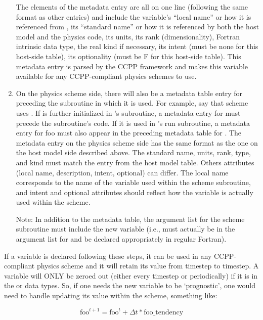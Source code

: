 \begin{enumerate}
The elements of the metadata entry are all on one line (following the same format as other entries) and include the variable's ``local name'' or how it is referenced from , its ``standard name'' or how it is referenced by both the host model and the physics code, its units, its rank (dimensionality), Fortran intrinsic data type, the real kind if necessary, its intent (must be none for this host-side table), its optionality (must be F for this host-side table). This metadata entry is parsed by the CCPP framework and makes this variable available for any CCPP-compliant physics schemes to use.

\item On the physics scheme side, there will also be a metadata table entry for  preceding the subroutine in which it is used. For example, say that scheme  uses . If  is further initialized in 's  subroutine, a metadata entry for  must precede the  subroutine's code. If it is used in 's run subroutine, a metadata entry for foo must also appear in the preceding metadata table for . The metadata entry on the physics scheme side has the same format as the one on the host model side described above. The standard name, units, rank, type, and kind must match the entry from the host model table. Others attributes (local name, description, intent, optional) can differ. The local name corresponds to the name of the variable used within the scheme subroutine, and intent and optional attributes should reflect how the variable is actually used within the scheme.

Note: In addition to the metadata table, the argument list for the scheme subroutine must include the new variable (i.e.,  must actually be in the argument list for  and be declared appropriately in regular Fortran).

\end{enumerate}

If a variable is declared following these steps, it can be used in any CCPP-compliant physics scheme and it will retain its value from timestep to timestep. A variable will ONLY be zeroed out (either every timestep or periodically) if it is in the  or  data types. So, if one needs the new variable to be `prognostic', one would need to handle updating its value within the scheme, something like:

\begin{equation}
\text{foo}^{t+1} = \text{foo}^t + \Delta t*\text{foo\_tendency}
\end{equation}


